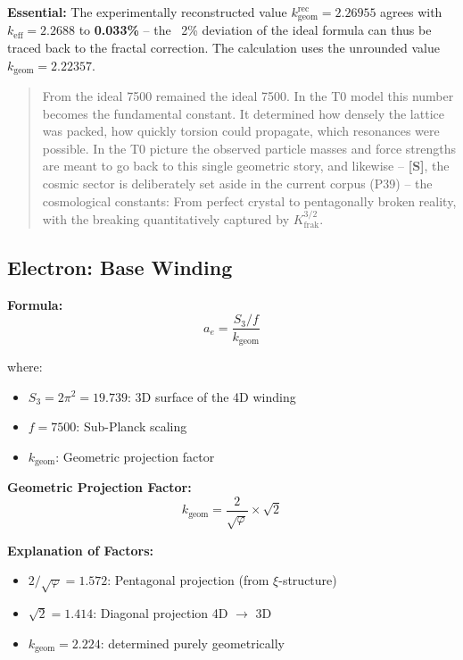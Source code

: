 	\textbf{Essential:} The experimentally reconstructed value \(k_\text{geom}^\text{rec} = 2.26955\) agrees with $k_\text{eff} = 2.2688$ to \textbf{0.033\%} -- the ~2\% deviation of the ideal formula can thus be traced back to the fractal correction. The calculation uses the unrounded value $k_\text{geom} = 2.22357$.
	\begin{quotation}
		From the ideal 7500 remained the ideal 7500. In the T0 model this number becomes the fundamental constant. It determined how densely the lattice was packed, how quickly torsion could propagate, which resonances were possible.
		In the T0 picture the observed particle masses and force strengths are meant to go back to this single geometric story, and likewise -- \textbf{[S]}, the cosmic sector is deliberately set aside in the current corpus (P39) -- the cosmological constants: From perfect crystal to pentagonally broken reality, with the breaking quantitatively captured by $K_\text{frak}^{3/2}$.
	\end{quotation}
	
	\subsection{Electron: Base Winding}
	
	\textbf{Formula:}
	\begin{equation}
		a_e = \frac{S_3/f}{k_{\text{geom}}}
		\label{eq:ae}
	\end{equation}
	
	where:
	\begin{itemize}
		\item $S_3 = 2\pi^2 = 19.739$: 3D surface of the 4D winding
		\item $f = 7500$: Sub-Planck scaling
		\item $k_{\text{geom}}$: Geometric projection factor
	\end{itemize}
	
	\textbf{Geometric Projection Factor:}
	\begin{equation}
		k_{\text{geom}} = \frac{2}{\sqrt{\varphi}} \times \sqrt{2}
		\label{eq:kgeom}
	\end{equation}
	
	\textbf{Explanation of Factors:}
	\begin{itemize}
		\item $2/\sqrt{\varphi} = 1.572$: Pentagonal projection (from $\xi$-structure)
		\item $\sqrt{2} = 1.414$: Diagonal projection 4D $\to$ 3D
		\item $k_{\text{geom}} = 2.224$: determined purely geometrically
	\end{itemize}
	
